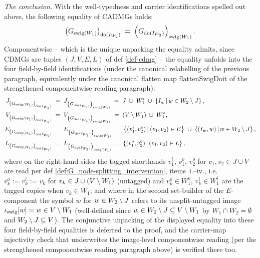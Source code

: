 \documentclass[main]{subfiles}
\providecommand{\flattenSwigDoit}{\mathrm{flattenSwigDoit}}
\begin{document}
\begin{Lem}
    \emph{The conclusion.} With the well-typedness and carrier identifications spelled out above, the following equality of CADMGs holds:
    \[ \left ( G_{\mathrm{swig}(W_1)} \right )_{\operatorname{do}(I_{W_2})} \;=\; \left ( G_{\operatorname{do}(I_{W_2})} \right )_{\mathrm{swig}(W_1)}. \]
    Componentwise -- which is the unique unpacking the equality admits, since CDMGs are tuples $(J, V, E, L)$ of def \ref{def-cdmg} -- the equality unfolds into the four field-by-field identifications (under the canonical relabelling of the previous paragraph, equivalently under the canonical flatten map $\flattenSwigDoit$ of the strengthened componentwise reading paragraph):
    \begin{align*}
        J_{\left ( G_{\mathrm{swig}(W_1)} \right )_{\operatorname{do}(I_{W_2})}} \;&=\; J_{\left ( G_{\operatorname{do}(I_{W_2})} \right )_{\mathrm{swig}(W_1)}} \;=\; J \;\cup\; W_1^i \;\cup\; \left \{ I_w \,\middle|\, w \in W_2 \setminus J \right \}, \\
        V_{\left ( G_{\mathrm{swig}(W_1)} \right )_{\operatorname{do}(I_{W_2})}} \;&=\; V_{\left ( G_{\operatorname{do}(I_{W_2})} \right )_{\mathrm{swig}(W_1)}} \;=\; (V \setminus W_1) \;\cup\; W_1^o, \\
        E_{\left ( G_{\mathrm{swig}(W_1)} \right )_{\operatorname{do}(I_{W_2})}} \;&=\; E_{\left ( G_{\operatorname{do}(I_{W_2})} \right )_{\mathrm{swig}(W_1)}} \;=\; \left \{ (v_1^i, v_2^o) \,\middle|\, (v_1, v_2) \in E \right \} \;\cup\; \left \{ (I_w, w) \,\middle|\, w \in W_2 \setminus J \right \}, \\
        L_{\left ( G_{\mathrm{swig}(W_1)} \right )_{\operatorname{do}(I_{W_2})}} \;&=\; L_{\left ( G_{\operatorname{do}(I_{W_2})} \right )_{\mathrm{swig}(W_1)}} \;=\; \left \{ (v_1^o, v_2^o) \,\middle|\, (v_1, v_2) \in L \right \},
    \end{align*}
    where on the right-hand sides the tagged shorthands $v_1^i$, $v_1^o$, $v_2^o$ for $v_1, v_2 \in J \cup V$ are read per def \ref{def:G_node-splitting_intervention}, items~i.--iv., i.e.\ $v_k^o := v_k^i := v_k$ for $v_k \in J \cup (V \setminus W_1)$ (untagged) and $v_k^o \in W_1^o$, $v_k^i \in W_1^i$ are the tagged copies when $v_k \in W_1$; and where in the second set-builder of the $E$-component the symbol $w$ for $w \in W_2 \setminus J$ refers to its unsplit-untagged image $\iota_{\mathrm{swig}}[w] = w \in V \setminus W_1$ (well-defined since $w \in W_2 \setminus J \subseteq V \setminus W_1$ by $W_1 \cap W_2 = \emptyset$ and $W_2 \setminus J \subseteq V$). The conjunctive unpacking of the displayed equality into these four field-by-field equalities is deferred to the proof, and the carrier-map injectivity check that underwrites the image-level componentwise reading (per the strengthened componentwise reading paragraph above) is verified there too.
\end{Lem}
\end{document}
